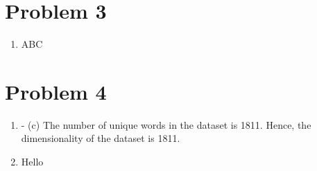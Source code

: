 \documentclass[11pt]{article}
\newcommand{\solution}[1]{{{\color{blue}{\bf Solution:} {#1}}}}
\begin{document}
\newpage
\section{Problem 3}
\begin{enumerate}
\item 
\solution{} \newline
ABC
\end{enumerate}

\newpage
\section{Problem 4}
\begin{enumerate}
\item - (c) \newline
The number of unique words in the dataset is 1811. \newline
Hence, the dimensionality of the dataset is 1811.
\setcounter{enumi}{3}
\item 
Hello
\end{enumerate}
\end{document}
